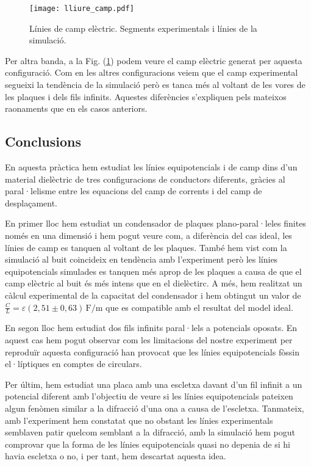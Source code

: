\documentclass[11pt]{article}
\numberwithin{equation}{section}
\numberwithin{figure}{section}
\numberwithin{table}{section}
\begin{document}
\begin{figure}
    \centering
    \texttt{[image: lliure\_camp.pdf]}
    \caption{Línies de camp elèctric. Segments experimentals i línies de la simulació.}
    \label{fig: lliure_camp}
\end{figure}

Per altra banda, a la Fig. (\ref{fig: lliure_camp}) podem veure el camp elèctric generat per aquesta configuració. Com en les altres configuracions veiem que el camp experimental segueixi la tendència de la simulació però es tanca més al voltant de les vores de les plaques i dels fils infinits. Aquestes diferències s'expliquen pels mateixos raonaments que en els casos anteriors.


\subsection{Conclusions}\label{sec: conc}

En aquesta pràctica hem estudiat les línies equipotencials i de camp dins d'un material dielèctric de tres configuracions de conductors diferents, gràcies al paral·lelisme entre les equacions del camp de corrents i del camp de desplaçament. 

En primer lloc hem estudiat un condensador de plaques plano-paral·leles finites només en una dimensió i hem pogut veure com, a diferència del cas ideal, les línies de camp es tanquen al voltant de les plaques. També hem vist com la simulació al buit coincideix en tendència amb l'experiment però les línies equipotencials simulades es tanquen més aprop de les plaques a causa de que el camp elèctric al buit és més intens que en el dielèctirc. A més, hem realitzat un càlcul experimental de la capacitat del condensador i hem obtingut un valor de $ \frac{C}{L} = \varepsilon  (2{,}51 \pm 0{,}63)\, \mathrm{F/m} $ que es compatible amb el resultat del model ideal.

En segon lloc hem estudiat dos fils infinits paral·lels a potencials oposats. En aquest cas hem pogut observar com les limitacions del nostre experiment per reproduïr aquesta configuració han provocat que les línies equipotencials fòssin el·líptiques en comptes de circulars.

Per últim, hem estudiat una placa amb una escletxa davant d'un fil infinit a un potencial diferent amb l'objectiu de veure si les línies equipotencials pateixen algun fenòmen similar a la difracció d'una ona a causa de l'escletxa. Tanmateix, amb l'experiment hem constatat que no obstant les línies experimentals semblaven patir quelcom semblant a la difracció, amb la simulació hem pogut comprovar que la forma de les línies equipotencials quasi no depenia de si hi havia escletxa o no, i per tant, hem descartat aquesta idea.
\end{document}
